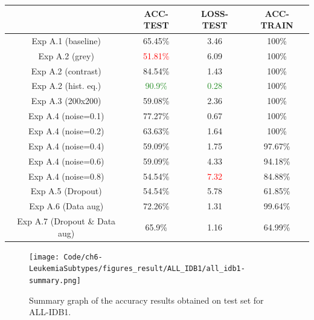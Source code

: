 \documentclass[11pt, openany]{report}
\theoremstyle{plain}
\theoremstyle{definition}
\theoremstyle{remark}
\begin{document}
\begin{center}
\begin{tabular}{|c|c|c|c|}
  \hline
          & \textbf{ACC-TEST} & \textbf{LOSS-TEST} & \textbf{ACC-TRAIN} \\
  \hline
  Exp A.1 (baseline)& 65.45\% & 3.46 & 100\% \\
  \hline
  Exp A.2 (grey) & \textcolor{red}{51.81\%} & 6.09 & 100\%  \\ 
  Exp A.2 (contrast) & 84.54\% & 1.43 & 100\% \\ 
  Exp A.2 (hist. eq.) & \textcolor{ForestGreen}{90.9\%} & \textcolor{ForestGreen}{0.28} & 100\% \\ 
  \hline
  Exp A.3 (200x200)& 59.08\% & 2.36 & 100\% \\
  \hline
  Exp A.4 (noise=0.1) & 77.27\% & 0.67 & 100\%  \\ 
  Exp A.4 (noise=0.2) & 63.63\% & 1.64 & 100\% \\ 
  Exp A.4 (noise=0.4) & 59.09\% & 1.75 & 97.67\% \\
  Exp A.4 (noise=0.6) & 59.09\% & 4.33 & 94.18\%  \\ 
  Exp A.4 (noise=0.8) & 54.54\% & \textcolor{red}{7.32} & 84.88\% \\
  \hline 
  Exp A.5 (Dropout)& 54.54\% & 5.78 & 61.85\% \\
  \hline
  Exp A.6 (Data aug)& 72.26\% & 1.31 & 99.64\% \\
  \hline
  Exp A.7 (Dropout \& Data aug)& 65.9\% & 1.16 & 64.99\% \\ 
  \hline
\end{tabular}
\label{table:summary-allidb1}

\begin{figure}[H]
  \centering
  \texttt{[image: Code/ch6-LeukemiaSubtypes/figures\_result/ALL\_IDB1/all\_idb1-summary.png]}
  \caption{Summary graph of the accuracy results obtained on test set for ALL-IDB1.}
  \label{fig:summary_res_ALL-IDB1}
\end{figure}

\end{center}
\end{document}
